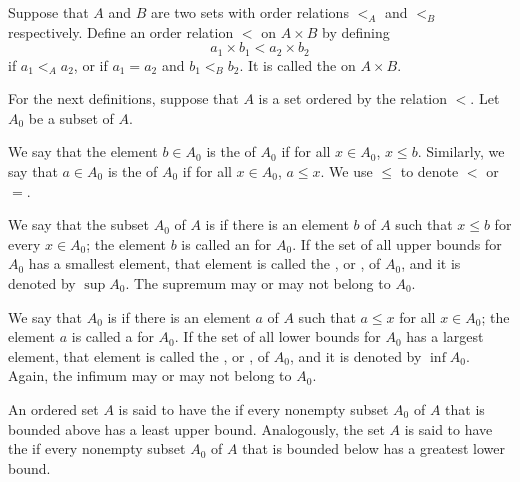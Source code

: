 \documentclass[12pt, a4paper, oneside, openright, titlepage]{book}
\begin{document}
\begin{appendices}
    \begin{defn}
        Suppose that $A$ and $B$ are two sets with order relations $<_A$ and $<_B$ respectively. Define an order relation $<$ on $A \times B$ by defining \begin{equation*}
            a_1\times b_1 < a_2\times b_2
        \end{equation*}
        if $a_1 <_A a_2$, or if $a_1 = a_2$ and $b_1 <_B b_2$. It is called the  on $A\times B$.
    \end{defn}

    
    For the next definitions, suppose that $A$ is a set ordered by the relation $<$. Let $A_0$ be a subset of $A$.


    \begin{defn}
        We say that the element $b \in A_0$ is the  of $A_0$ if for all $x \in A_0$, $x \leq b$. Similarly, we say that $a \in A_0$ is the  of $A_0$ if for all $x \in A_0$, $a \leq x$. We use $\leq$ to denote $<$ or $=$.
    \end{defn}


    \begin{defn}
        We say that the subset $A_0$ of $A$ is  if there is an element $b$ of $A$ such that $x \leq b$ for every $x \in A_0$; the element $b$ is called an  for $A_0$. If the set of all upper bounds for $A_0$ has a smallest element, that element is called the , or , of $A_0$, and it is denoted by $\sup A_0$. The supremum may or may not belong to $A_0$.
    \end{defn}


    \begin{defn}
        We say that $A_0$ is  if there is an element $a$ of $A$ such that $a \leq x$ for all $x \in A_0$; the element $a$ is called a  for $A_0$. If the set of all lower bounds for $A_0$ has a largest element, that element is called the , or , of $A_0$, and it is denoted by $\inf A_0$. Again, the infimum may or may not belong to $A_0$.
    \end{defn}


    \begin{defn}
        An ordered set $A$ is said to have the  if every nonempty subset $A_0$ of $A$ that is bounded above has a least upper bound. Analogously, the set $A$ is said to have the  if every nonempty subset $A_0$ of $A$ that is bounded below has a greatest lower bound. 


\end{defn}
\end{appendices}
\end{document}
